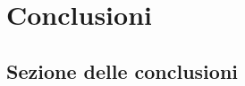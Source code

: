 \chapter*{Conclusioni}
\vspace{2cm}

\begin{flushright}
 \textit{\lipsum[1][1]}
\end{flushright}

\vspace{0.5cm}

\lipsum[1-2]

\section*{Sezione delle conclusioni}
\lipsum[3]